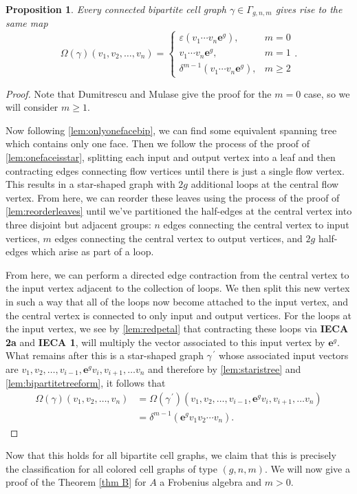 \documentclass{amsart}
\newcommand{\be}{\begin{equation}}
\newcommand{\ee}{\end{equation}}
\newcommand{\pri}{^{\,\prime}}
\newcommand{\eps}{\varepsilon}
\newcommand{\eul}{\mathbf{e}}
\newtheorem{Prop}[Lem]{Proposition}
\theoremstyle{definition}
\begin{document}
\begin{Prop}\label{prop:bipartiteposgen}
    Every connected bipartite cell graph $\gamma\in\Gamma_{g,n,m}$ gives rise to the same map
    \be\label{eqn:bipartiteposgen}
    \Omega(\gamma)(v_1,v_2,\ldots,v_n)=\begin{cases}
        \eps(v_1\cdots v_n\eul^g),& m=0\\
        v_1\cdots v_n\eul^g,& m=1\\
        \delta^{m-1}(v_1\cdots v_n\eul^g),& m\geq 2
    \end{cases}.
    \ee
\end{Prop}
\begin{proof}
    Note that Dumitrescu and Mulase \cite{DM_ribbon} give the proof for the $m=0$ case, so we will consider $m\geq 1$.
    
    \noindent Now following \ref{lem:onlyonefacebip}, we can find some equivalent spanning tree which contains only one face. Then we follow the process of the proof of \ref{lem:onefaceisstar}, splitting each input and output vertex into a leaf and then contracting edges connecting flow vertices until there is just a single flow vertex. This results in a star-shaped graph with $2g$ additional loops at the central flow vertex. From here, we can reorder these leaves using the process of the proof of \ref{lem:reorderleaves} until we've partitioned the half-edges at the central vertex into three disjoint but adjacent groups: $n$ edges connecting the central vertex to input vertices, $m$ edges connecting the central vertex to output vertices, and $2g$ half-edges which arise as part of a loop.

    \noindent From here, we can perform a directed edge contraction from the central vertex to the input vertex adjacent to the collection of loops. We then split this new vertex in such a way that all of the loops now become attached to the input vertex, and the central vertex is connected to only input and output vertices. For the loops at the input vertex, we see by \ref{lem:redpetal} that contracting these loops via \textbf{IECA 2a} and \textbf{IECA 1}, will multiply the vector associated to this input vertex by $\eul^g$. What remains after this is a star-shaped graph $\gamma\pri$ whose associated input vectors are $v_1,v_2,\ldots,v_{i-1},\eul^g v_i,v_{i+1},\ldots v_n$ and therefore by \ref{lem:staristree} and \ref{lem:bipartitetreeform}, it follows that 
    \begin{align*}
        \Omega(\gamma)(v_1,v_2,\ldots,v_n)&=\Omega(\gamma\pri)(v_1,v_2,\ldots,v_{i-1},\eul^g v_i,v_{i+1},\ldots v_n)\\
        &=\delta^{m-1}(\eul^gv_1v_2\cdots v_n).
    \end{align*}
\end{proof}
\noindent Now that this holds for all bipartite cell graphs, we claim that this is precisely the classification for all colored cell graphs of type $(g,n,m)$. We will now give a proof of the Theorem \ref{thm B} for $A$ a Frobenius algebra and $m>0$.
\end{document}
